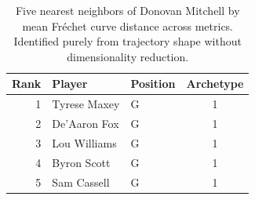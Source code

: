 \begin{table}[htbp]
  \centering\small
  \begin{tabular}{rllc}
    \toprule
    Rank & Player & Position & Archetype \\
    \midrule
    1 & Tyrese Maxey & G & 1 \\
    2 & De'Aaron Fox & G & 1 \\
    3 & Lou Williams & G & 1 \\
    4 & Byron Scott & G & 1 \\
    5 & Sam Cassell & G & 1 \\
    \bottomrule
  \end{tabular}
  \caption{Five nearest neighbors of Donovan Mitchell by mean Fr\'{e}chet curve distance across metrics. Identified purely from trajectory shape without dimensionality reduction.}
  \label{tab:Donovan_Mitchell_frechet_curve_neighbors}
\end{table}


